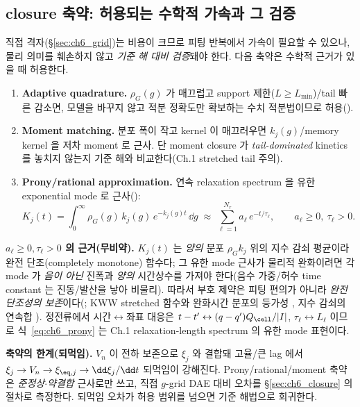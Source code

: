 \subsection{closure 축약: 허용되는 수학적 가속과 그 검증}\label{sec:ch6_reduction}
직접 격자(\S\ref{sec:ch6_grid})는 비용이 크므로 피팅 반복에서 가속이 필요할 수 있으나, 물리 의미를 훼손하지
않고 \emph{기준 해 대비 검증}돼야 한다. 다음 축약은 수학적 근거가 있을 때 허용한다.
\begin{enumerate}[label=\textbf{(\alph*)},leftmargin=2.4em]
\item \textbf{Adaptive quadrature.} $\rho_G(g)$ 가 매끄럽고 support 제한($L\ge L_{\min}$)/tail 빠른 감소면, 모델을
  바꾸지 않고 적분 정확도만 확보하는 수치 적분법이므로 허용().
\item \textbf{Moment matching.} 분포 폭이 작고 kernel 이 매끄러우면 $k_j(g)$/memory kernel 을 저차 moment 로 근사.
  단 moment closure 가 \emph{tail-dominated} kinetics 를 놓치지 않는지 기준 해와 비교한다(Ch.1 stretched tail 주의).
\item \textbf{Prony/rational approximation.} 연속 relaxation spectrum 을 유한 exponential mode 로 근사():
\begin{equation}
K_j(t)=\int_0^\infty\rho_G(g)\,k_j(g)\,e^{-k_j(g)t}\,\dd g\;\approx\;\sum_{\ell=1}^{N_r}a_\ell\,e^{-t/\tau_\ell},
\qquad a_\ell\ge0,\ \tau_\ell>0.
\label{eq:ch6_prony}
\end{equation}
\end{enumerate}
\textbf{$a_\ell\ge0,\tau_\ell>0$ 의 근거(무비약).} $K_j(t)$ 는 \emph{양의} 분포 $\rho_G k_j$ 위의 지수 감쇠 평균이라
완전 단조(completely monotone) 함수다; 그 유한 mode 근사가 물리적 완화이려면 각 mode 가 \emph{음이 아닌} 진폭과
\emph{양의} 시간상수를 가져야 한다(음수 가중/허수 time constant 는 진동/발산을 낳아 비물리). 따라서 부호 제약은
피팅 편의가 아니라 \emph{완전 단조성의 보존}이다(; KWW stretched 함수와 완화시간 분포의 등가성
\cite{lindsey1980}, 지수 감쇠의 연속합 \cite{johnston2006}). 정전류에서 시간$\leftrightarrow$좌표 대응은
$t-t'\leftrightarrow(q-q')Q_\cell/|I|$, $\tau_\ell\leftrightarrow L_\ell$ 이므로 식~\eqref{eq:ch6_prony} 는 Ch.1
relaxation-length spectrum 의 유한 mode 표현이다.
\begin{boundbox}
\textbf{축약의 한계(되먹임).} $V_n$ 이 전하 보존으로 $\xi_j$ 와 결합돼 고율/큰 lag 에서 $\xi_j\to V_n\to\xi_{\eq,j}
\to\dd\xi_j/\dd t$ 되먹임이 강해진다. Prony/rational/moment 축약은 \emph{준정상$\cdot$약결합} 근사로만 쓰고, 직접
$g$-grid DAE 대비 오차를 \S\ref{sec:ch6_closure} 의 절차로 측정한다. 되먹임 오차가 허용 범위를 넘으면 기준
해법으로 회귀한다.
\end{boundbox}

